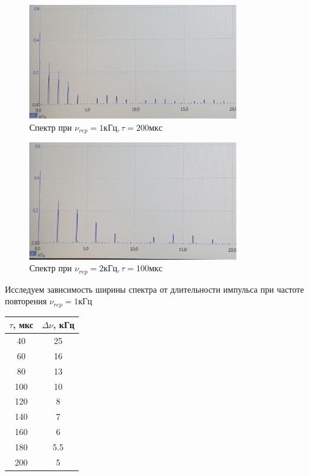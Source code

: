\documentclass[11pt]{article}
\begin{document}
\begin{figure}[H]
    \centering
    \includegraphics[width=0.8\textwidth]{2.jpg}
    \caption{Спектр при \( \nu_{rep} = 1 кГц, \tau = 200мкс \)} 
    \label{spec_2}
\end{figure}

\begin{figure}[H]
    \centering
    \includegraphics[width=0.8\textwidth]{3.jpg}
    \caption{Спектр при \( \nu_{rep} = 2 кГц, \tau = 100мкс \)} 
    \label{spec_3}
\end{figure}

Исследуем зависимость ширины спектра от длительности импульса при частоте повторения \( \nu_{rep} = 1кГц \)

\begin{table}[H]
    \centering
    \begin{tabular}{|c|c|}
        \hline
        \(\tau\), мкс& \(\Delta\nu\), кГц \\\hline
        40                        & 25                  \\\hline
        60                        & 16                  \\\hline
        80                        & 13                  \\\hline
        100                       & 10                  \\\hline
        120                       & 8                   \\\hline
        140                       & 7                   \\\hline
        160                       & 6                   \\\hline
        180                       & 5.5                \\\hline
        200                       & 5                   \\\hline
    \end{tabular}
\end{table}
\end{document}
